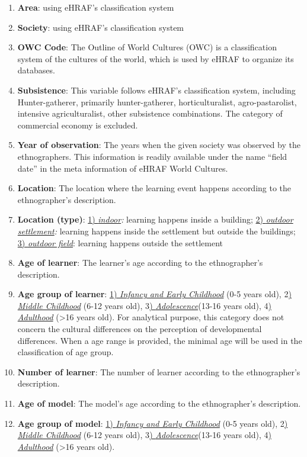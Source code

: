 \documentclass[
  11pt,
]{article}
\begin{document}
\begin{enumerate}
\def\labelenumi{\arabic{enumi}.}
\item
  \textbf{Area}: using eHRAF's classification system
\item
  \textbf{Society}: using eHRAF's classification system
\item
  \textbf{OWC Code}: The Outline of World Cultures (OWC) is a classification system of the cultures of the world, which is used by eHRAF to organize its databases.
\item
  \textbf{Subsistence}: This variable follows eHRAF's classification system, including Hunter-gatherer, primarily hunter-gatherer, horticulturalist, agro-pastarolist, intensive agriculturalist, other subsistence combinations. The category of commercial economy is excluded.
\item
  \textbf{Year of observation}: The years when the given society was observed by the ethnographers. This information is readily available under the name ``field date'' in the meta information of eHRAF World Cultures.
\item
  \textbf{Location}: The location where the learning event happens according to the ethnographer's description.
\item
  \textbf{Location (type)}: \ul{1) \emph{indoor}}\emph{:} learning happens inside a building; \ul{2) \emph{outdoor settlement}}\emph{:} learning happens inside the settlement but outside the buildings; \ul{3) \emph{outdoor field}}: learning happens outside the settlement
\item
  \textbf{Age of learner}: The learner's age according to the ethnographer's description.
\item
  \textbf{Age group of learner}: \ul{1) \emph{Infancy and Early Childhood}} (0-5 years old), 2\ul{) \emph{Middle Childhood}} (6-12 years old), 3\ul{) \emph{Adolescence}}(13-16 years old), 4\ul{) \emph{Adulthood}} (\textgreater16 years old). For analytical purpose, this category does not concern the cultural differences on the perception of developmental differences. When a age range is provided, the minimal age will be used in the classification of age group.
\item
  \textbf{Number of learner}: The number of learner according to the ethnographer's description.
\item
  \textbf{Age of model}: The model's age according to the ethnographer's description.
\item
  \textbf{Age group of model}: \ul{1) \emph{Infancy and Early Childhood}} (0-5 years old), 2\ul{) \emph{Middle Childhood}} (6-12 years old), 3\ul{) \emph{Adolescence}}(13-16 years old), 4\ul{) \emph{Adulthood}} (\textgreater16 years old).

\end{enumerate}
\end{document}
